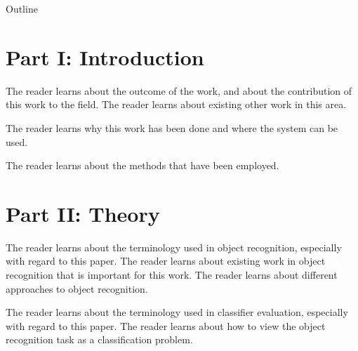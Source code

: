 \clearemptydoublepage

{}

\begin{center}
	\huge{Outline}
\end{center}

\section*{Part I: Introduction}

  \vspace{1mm}

The reader learns about the outcome of the work, and about the contribution of
this work to the field. The reader learns about existing other work in this
area.

  \vspace{1mm}

The reader learns why this work has been done and where the system can be used.

  \vspace{1mm}

The reader learns about the methods that have been employed.

\section*{Part II: Theory}

  \vspace{1mm}

The reader learns about the terminology used in object recognition,
especially with regard to this paper. The reader learns about existing work in
object recognition that is important for this work. The reader learns about
different approaches to object recognition.

  \vspace{1mm}

The reader learns about the terminology used in classifier evaluation,
especially with regard to this paper. The reader learns about how to view
the object recognition task as a classification problem. 

